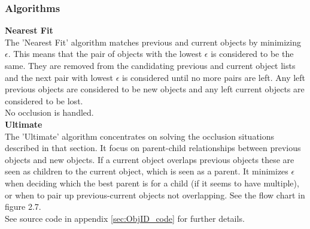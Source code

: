 \subsubsection{Algorithms}
\textbf{Nearest Fit} \\
The 'Nearest Fit' algorithm matches previous and current objects by minimizing $\epsilon$. This means that the pair of objects with the lowest $\epsilon$ is considered to be the same. They are removed from the candidating previous and current object lists and the next pair with lowest $\epsilon$ is considered until no more pairs are left. Any left previous objects are considered to be new objects and any left current objects are considered to be lost. \\
No occlusion is handled. \\
\newline
\textbf{Ultimate}\\
The 'Ultimate' algorithm concentrates on solving the occlusion situations described in that section. It focus on parent-child relationships between previous objects and new objects. If a current object overlaps previous objects these are seen as children to the current object, which is seen as a parent. It minimizes $\epsilon$ when deciding which the best parent is for a child (if it seems to have multiple), or when to pair up previous-current objects not overlapping. See the flow chart in figure 2.7. \\
\newline
See source code in appendix \ref{sec:ObjID_code} for further details. %

